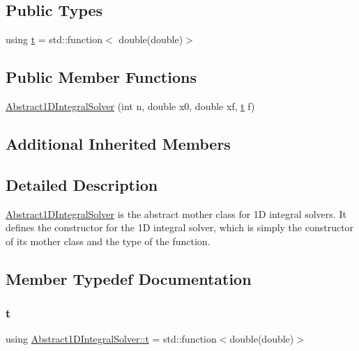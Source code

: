 \subsection*{Public Types}
\begin{DoxyCompactItemize}
\item 
using \hyperlink{class_abstract1_d_integral_solver_a7d8e60dfe7eb70e5c19dd71ac0b03880}{t} = std\+::function$<$ double(double)$>$
\end{DoxyCompactItemize}
\subsection*{Public Member Functions}
\begin{DoxyCompactItemize}
\item 
\hyperlink{class_abstract1_d_integral_solver_aff8ede805704db176953095b7578db37}{Abstract1\+D\+Integral\+Solver} (int n, double x0, double xf, \hyperlink{class_abstract1_d_integral_solver_a7d8e60dfe7eb70e5c19dd71ac0b03880}{t} f)
\end{DoxyCompactItemize}
\subsection*{Additional Inherited Members}


\subsection{Detailed Description}
\hyperlink{class_abstract1_d_integral_solver}{Abstract1\+D\+Integral\+Solver} is the abstract mother class for 1D integral solvers. It defines the constructor for the 1D integral solver, which is simply the constructor of its mother class and the type of the function. 

\subsection{Member Typedef Documentation}
\mbox{\label{class_abstract1_d_integral_solver_a7d8e60dfe7eb70e5c19dd71ac0b03880}} 
\subsubsection{\texorpdfstring{t}{t}}
{\footnotesize\ttfamily using \hyperlink{class_abstract1_d_integral_solver_a7d8e60dfe7eb70e5c19dd71ac0b03880}{Abstract1\+D\+Integral\+Solver\+::t} =  std\+::function$<$double(double)$>$}

